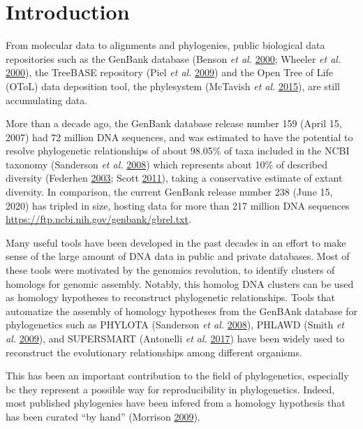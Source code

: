 \documentclass[]{article}
\begin{document}
\hypertarget{introduction}{%
\section{Introduction}\label{introduction}}

From molecular data to alignments and phylogenies, public biological data repositories such as the GenBank database (Benson \emph{et al.} \protect\hyperlink{ref-benson2000genbank}{2000}; Wheeler \emph{et al.} \protect\hyperlink{ref-wheeler2000database}{2000}), the TreeBASE repository (Piel \emph{et al.} \protect\hyperlink{ref-piel2009treebase}{2009}) and the Open Tree of Life (OToL) data deposition tool, the phylesystem (McTavish \emph{et al.} \protect\hyperlink{ref-mctavish2015phylesystem}{2015}), are still accumulating data.

More than a decade ago, the GenBank database release number 159 (April 15, 2007) had 72 million DNA sequences, and was estimated to have the potential to resolve phylogenetic relationships of about 98.05\% of taxa included in the NCBI taxonomy (Sanderson \emph{et al.} \protect\hyperlink{ref-sanderson2008phylota}{2008}) which represents about 10\% of described diversity (Federhen \protect\hyperlink{ref-federhen2003taxonomy}{2003}; Scott \protect\hyperlink{ref-scott2011ncbi}{2011}), taking a conservative estimate of extant diversity.
In comparison, the current GenBank release number 238 (June 15, 2020) has tripled in size, hosting data for more than 217 million DNA sequences \url{https://ftp.ncbi.nih.gov/genbank/gbrel.txt}.

Many useful tools have been developed in the past decades in an effort to make sense of the large amount of DNA data in public and private databases. Most of these tools were motivated by the genomics revolution, to identify clusters of homologs for genomic assembly. Notably, this homolog DNA clusters can be used as homology hypotheses to reconstruct phylogenetic relationships.
Tools that automatize the assembly of homology hypotheses from the GenBAnk database for phylogenetics such as PHYLOTA (Sanderson \emph{et al.} \protect\hyperlink{ref-sanderson2008phylota}{2008}), PHLAWD (Smith \emph{et al.} \protect\hyperlink{ref-smith2009mega}{2009}), and SUPERSMART (Antonelli \emph{et al.} \protect\hyperlink{ref-antonelli2017toward}{2017}) have been widely used to reconstruct the evolutionary relationships among different organisms.

This has been an important contribution to the field of phylogenetics, especially bc they represent a possible way for reproducibility in phylogenetics. Indeed, most published phylogenies have been infered from a homology hypothesis that has been curated ``by hand'' (Morrison \protect\hyperlink{ref-morrison2009would}{2009}).
\end{document}
